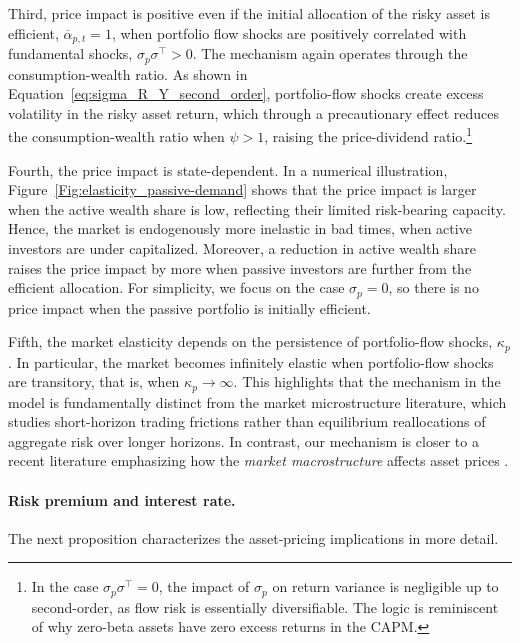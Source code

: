 \documentclass[12pt,english]{article}
\begin{document}
Third, price impact is positive even if the initial allocation of the risky asset is efficient, $\overline{\alpha}_{p,t}=1$, when portfolio flow shocks are positively correlated with fundamental shocks, $\sigma_p \sigma^\top > 0$.
The mechanism again operates through the consumption-wealth ratio.
As shown in Equation~\eqref{eq:sigma_R_Y_second_order}, portfolio-flow shocks create excess volatility in the risky asset return, which through a precautionary effect reduces the consumption-wealth ratio when $\psi > 1$, raising the price-dividend ratio.\footnote{In the case $\sigma_p \sigma^\top = 0$, the impact of $\sigma_p$ on return variance is negligible up to second-order, as flow risk is essentially diversifiable. 
The logic is reminiscent of why zero-beta assets have zero excess returns in the CAPM. 
}

Fourth, the price impact is state-dependent.
In a numerical illustration, Figure~\ref{Fig:elasticity_passive-demand} shows that the price impact is larger when the active wealth share is low, reflecting their limited risk-bearing capacity.
Hence, the market is endogenously more inelastic in bad times, when active investors are under capitalized.
Moreover, a reduction in active wealth share raises the price impact by more when passive investors are further from the efficient allocation.
For simplicity, we focus on the case $\sigma_p = 0$, so there is no price impact when the passive portfolio is initially efficient.

Fifth, the market elasticity depends on the persistence of portfolio-flow shocks, $\kappa_p$.
In particular, the market becomes infinitely elastic when portfolio-flow shocks are transitory, that is, when $\kappa_p \to \infty$.
This highlights that the mechanism in the model is fundamentally distinct from the market microstructure literature, which studies short-horizon trading frictions rather than equilibrium reallocations of aggregate risk over longer horizons.
In contrast, our mechanism is closer to a recent literature emphasizing how the \textit{market macrostructure} affects asset prices \citep[see, e.g.,][]{haddadMuir2025marketMacrostructure}.

\paragraph{Risk premium and interest rate.} 
The next proposition characterizes the asset-pricing implications in more detail.
\end{document}
